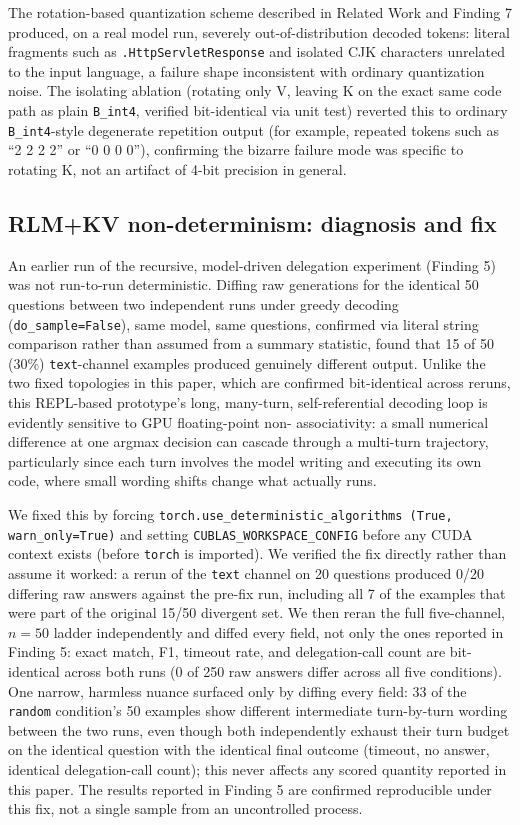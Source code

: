 \documentclass[11pt]{article}
\begin{document}
The rotation-based quantization scheme described in Related Work and
Finding 7 produced, on a real model run, severely out-of-distribution
decoded tokens: literal fragments such as \texttt{.HttpServletResponse}
and isolated CJK characters unrelated to the input language, a failure
shape inconsistent with ordinary quantization noise. The isolating
ablation (rotating only V, leaving K on the exact same code path as plain
\texttt{B\_int4}, verified bit-identical via unit test) reverted this to
ordinary \texttt{B\_int4}-style degenerate repetition output (for
example, repeated tokens such as ``2 2 2 2'' or ``0 0 0 0''), confirming
the bizarre failure mode was specific to rotating K, not an artifact of
4-bit precision in general.

\subsection{RLM+KV non-determinism: diagnosis and fix}
\label{app:nondeterminism}

An earlier run of the recursive, model-driven delegation experiment
(Finding 5) was not run-to-run deterministic. Diffing raw generations for
the identical 50 questions between two independent runs under greedy
decoding (\texttt{do\_sample=False}), same model, same questions,
confirmed via literal string comparison rather than assumed from a
summary statistic, found that 15 of 50 (30\%) \texttt{text}-channel
examples produced genuinely different output. Unlike the two fixed
topologies in this paper, which are confirmed bit-identical across
reruns, this REPL-based prototype's long, many-turn, self-referential
decoding loop is evidently sensitive to GPU floating-point non-
associativity: a small numerical difference at one argmax decision can
cascade through a multi-turn trajectory, particularly since each turn
involves the model writing and executing its own code, where small
wording shifts change what actually runs.

We fixed this by forcing \texttt{torch.use\_deterministic\_algorithms
(True, warn\_only=True)} and setting \texttt{CUBLAS\_WORKSPACE\_CONFIG}
before any CUDA context exists (before \texttt{torch} is imported). We
verified the fix directly rather than assume it worked: a rerun of the
\texttt{text} channel on 20 questions produced 0/20 differing raw
answers against the pre-fix run, including all 7 of the examples that
were part of the original 15/50 divergent set. We then reran the full
five-channel, $n=50$ ladder independently and diffed every field, not
only the ones reported in Finding 5: exact match, F1, timeout rate, and
delegation-call count are bit-identical across both runs (0 of 250 raw
answers differ across all five conditions). One narrow, harmless nuance
surfaced only by diffing every field: 33 of the \texttt{random}
condition's 50 examples show different intermediate turn-by-turn wording
between the two runs, even though both independently exhaust their turn
budget on the identical question with the identical final outcome
(timeout, no answer, identical delegation-call count); this never affects
any scored quantity reported in this paper. The results reported in
Finding 5 are confirmed reproducible under this fix, not a single sample
from an uncontrolled process.
\end{document}

